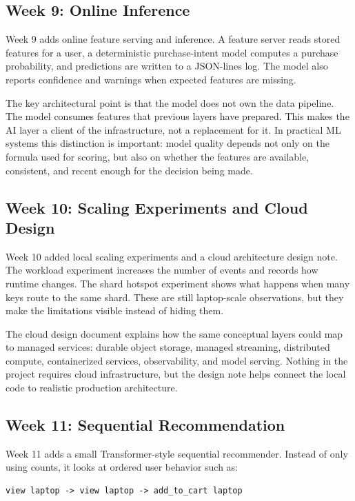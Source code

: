 \subsection{Week 9: Online Inference}

Week 9 adds online feature serving and inference. A feature server reads stored
features for a user, a deterministic purchase-intent model computes a purchase
probability, and predictions are written to a JSON-lines log. The model also
reports confidence and warnings when expected features are missing.

The key architectural point is that the model does not own the data pipeline.
The model consumes features that previous layers have prepared. This makes the
AI layer a client of the infrastructure, not a replacement for it. In practical
ML systems this distinction is important: model quality depends not only on the
formula used for scoring, but also on whether the features are available,
consistent, and recent enough for the decision being made.

\subsection{Week 10: Scaling Experiments and Cloud Design}

Week 10 added local scaling experiments and a cloud architecture design note.
The workload experiment increases the number of events and records how runtime
changes. The shard hotspot experiment shows what happens when many keys route
to the same shard. These are still laptop-scale observations, but they make the
limitations visible instead of hiding them.

The cloud design document explains how the same conceptual layers could map to
managed services: durable object storage, managed streaming, distributed compute,
containerized services, observability, and model serving. Nothing in the project
requires cloud infrastructure, but the design note helps connect the local code
to realistic production architecture.

\subsection{Week 11: Sequential Recommendation}

Week 11 adds a small Transformer-style sequential recommender. Instead of only
using counts, it looks at ordered user behavior such as:

\begin{lstlisting}
view laptop -> view laptop -> add_to_cart laptop
\end{lstlisting}

